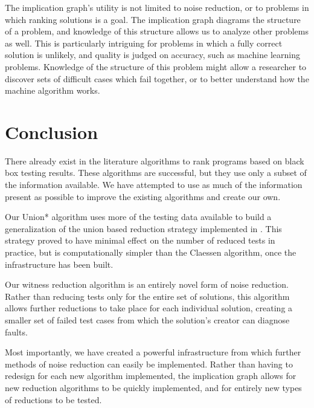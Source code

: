 \documentclass[11pt,twoside]{article}
\let\cite=\citep
\begin{document}
The implication graph's utility is not limited to noise reduction, or to problems in which ranking solutions is a goal. The implication graph diagrams the structure of a problem, and knowledge of this structure allows us to analyze other problems as well. This is particularly intriguing for problems in which a fully correct solution is unlikely, and quality is judged on accuracy, such as machine learning problems. Knowledge of the structure of this problem might allow a researcher to discover sets of difficult cases which fail together, or to better understand how the machine algorithm works.


\section{Conclusion}
There already exist in the literature algorithms to rank programs based on black box testing results. These algorithms are successful, but they use only a subset of the information available. We have attempted to use as much of the information present as possible to improve the existing algorithms and create our own.

Our Union* algorithm uses more of the testing data available to build a generalization of the union based reduction strategy implemented in \cite{Claessen}. This strategy proved to have minimal effect on the number of reduced tests in practice, but is computationally simpler than the Claessen algorithm, once the infrastructure has been built.

Our witness reduction algorithm is an entirely novel form of noise reduction. Rather than reducing tests only for the entire set of solutions, this algorithm allows further reductions to take place for each individual solution, creating a smaller set of failed test cases from which the solution's creator can diagnose faults.

Most importantly, we have created a powerful infrastructure from which further methods of noise reduction can easily be implemented. Rather than having to redesign for each new algorithm implemented, the implication graph allows for new reduction algorithms to be quickly implemented, and for entirely new types of reductions to be tested.



\end{document}

